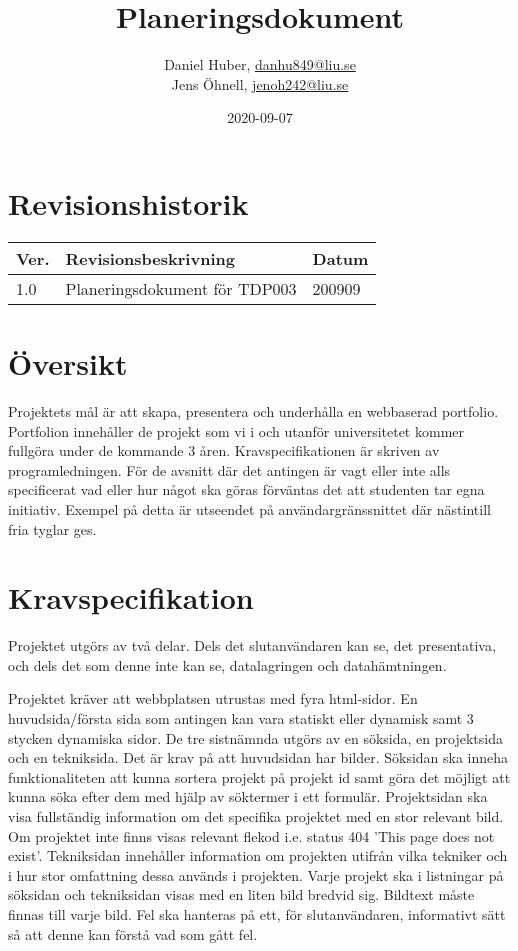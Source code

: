 \documentclass{TDP003mall}
\author{Daniel Huber, \url{danhu849@liu.se}\\
  Jens Öhnell, \url{jenoh242@liu.se}}
\title{Planeringsdokument}
\date{2020-09-07}
\begin{document}
\projectpage
\section{Revisionshistorik}
\begin{table}[!h]
\begin{tabularx}{\linewidth}{|l|X|l|}
\hline
Ver. & Revisionsbeskrivning & Datum \\\hline
1.0 & Planeringsdokument för TDP003 & 200909 \\\hline
\end{tabularx}
\end{table}


\section{Översikt}
Projektets mål är att skapa, presentera och underhålla en webbaserad portfolio. Portfolion innehåller de projekt som vi i och utanför universitetet kommer fullgöra under de kommande 3 åren. Kravspecifikationen är skriven av programledningen. För de avsnitt där det antingen är vagt eller inte alls specificerat vad eller hur något ska göras förväntas det att studenten tar egna initiativ. Exempel på detta är utseendet på användargränssnittet där nästintill fria tyglar ges.


\section{Kravspecifikation}
Projektet utgörs av två delar. Dels det slutanvändaren kan se, det presentativa, och dels det som denne inte kan se, datalagringen och datahämtningen.

Projektet kräver att webbplatsen utrustas med fyra html-sidor. En huvudsida/första sida som antingen kan vara statiskt eller dynamisk samt 3 stycken dynamiska sidor. De tre sistnämnda utgörs av en söksida, en projektsida och en tekniksida. Det är krav på att huvudsidan har bilder. Söksidan ska inneha funktionaliteten att kunna sortera projekt på projekt id samt göra det möjligt att kunna söka efter dem med hjälp av söktermer i ett formulär. Projektsidan ska visa fullständig information om det specifika projektet med en stor relevant bild. Om projektet inte finns visas relevant flekod i.e. status 404 'This page does not exist'. Tekniksidan innehåller information om projekten utifrån vilka tekniker och i hur stor omfattning dessa används i projekten. Varje projekt ska i listningar på söksidan och tekniksidan visas med en liten bild bredvid sig. Bildtext måste finnas till varje bild. Fel ska hanteras på ett, för slutanvändaren, informativt sätt så att denne kan förstå vad som gått fel.
\end{document}
